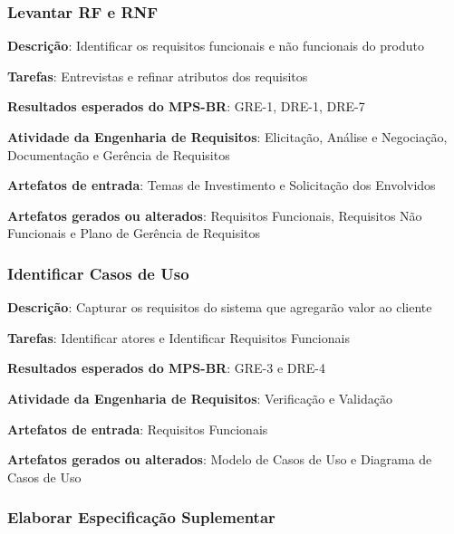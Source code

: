 \subsubsection{Levantar RF e RNF}

\begin{description}
\item\textbf{Descrição}: Identificar os requisitos funcionais e não funcionais do produto
\item\textbf{Tarefas}: Entrevistas e refinar atributos dos requisitos
\item\textbf{Resultados esperados do MPS-BR}: GRE-1, DRE-1, DRE-7
\item\textbf{Atividade da Engenharia de Requisitos}:  Elicitação, Análise e Negociação, Documentação e Gerência de Requisitos
\item\textbf{Artefatos de entrada}: Temas de Investimento e Solicitação dos Envolvidos
\item\textbf{Artefatos gerados ou alterados}: Requisitos Funcionais, Requisitos Não Funcionais e Plano de Gerência de Requisitos
\end{description}

\subsubsection{Identificar Casos de Uso}

\begin{description}
\item\textbf{Descrição}: Capturar os requisitos do sistema que agregarão valor ao cliente
\item\textbf{Tarefas}: Identificar atores e Identificar Requisitos Funcionais
\item\textbf{Resultados esperados do MPS-BR}: GRE-3 e DRE-4
\item\textbf{Atividade da Engenharia de Requisitos}: Verificação e Validação
\item\textbf{Artefatos de entrada}: Requisitos Funcionais
\item\textbf{Artefatos gerados ou alterados}: Modelo de Casos de Uso e Diagrama de Casos de Uso
\end{description}

\subsubsection{Elaborar Especificação Suplementar}

